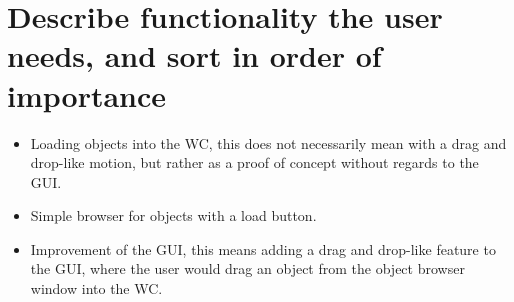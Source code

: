 \section{Describe functionality the user needs, and sort in order of importance}

\begin{itemize}

\item Loading objects into the WC, this does not necessarily mean with a drag and drop-like motion, but rather as a proof of concept without regards to the GUI.

\item Simple browser for objects with a load button.

\item Improvement of the GUI, this means adding a drag and drop-like feature to the GUI, where the user would drag an object from the object browser window into the WC.

\end{itemize}